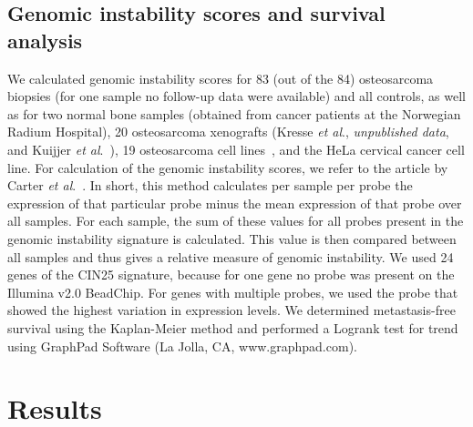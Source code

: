 \subsection{Genomic instability scores and survival analysis}
We calculated genomic instability scores for 83
(out of the 84) osteosarcoma biopsies (for one sample
no follow\hyp{}up data were available) and all controls,
as well as for two normal bone samples
(obtained from cancer patients at the Norwegian
Radium Hospital), 20 osteosarcoma xenografts
(Kresse {\it et al}., {\it unpublished data}, and Kuijjer {\it et al}.~\cite{kuijjer2011mrna}), 19 osteosarcoma cell lines~\cite{ottaviano2010molecular},
and the HeLa cervical cancer cell line. For
calculation of the genomic instability scores, we
refer to the article by Carter {\it et al}.~\cite{carter2006signature}. In short,
this method calculates per sample per probe the
expression of that particular probe minus the
mean expression of that probe over all samples.
For each sample, the sum of these values for all
probes present in the genomic instability signature
is calculated. This value is then compared
between all samples and thus gives a relative measure
of genomic instability. We used 24 genes of
the CIN25 signature, because for one gene no
probe was present on the Illumina v2.0 BeadChip.
For genes with multiple probes, we used the
probe that showed the highest variation in expression
levels. We determined metastasis\hyp{}free survival
using the Kaplan\hyp{}Meier method and performed a
Logrank test for trend using GraphPad Software
(La Jolla, CA, www.graphpad.com).

\section{Results}\label{results7}
